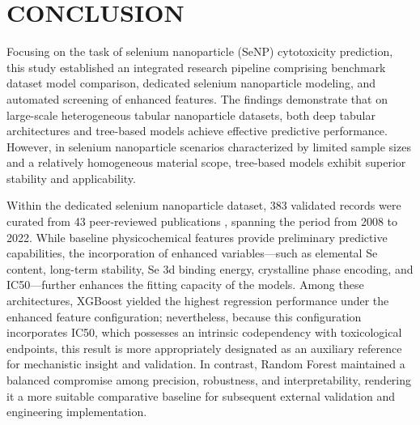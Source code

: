 \section{CONCLUSION}

Focusing on the task of selenium nanoparticle (SeNP) cytotoxicity prediction, this study established an integrated research pipeline comprising benchmark dataset model comparison, dedicated selenium nanoparticle modeling, and automated screening of enhanced features. The findings demonstrate that on large-scale heterogeneous tabular nanoparticle datasets, both deep tabular architectures and tree-based models achieve effective predictive performance. However, in selenium nanoparticle scenarios characterized by limited sample sizes and a relatively homogeneous material scope, tree-based models exhibit superior stability and applicability.

Within the dedicated selenium nanoparticle dataset, 383 validated records were curated from 43 peer-reviewed publications \cite{chen_selenium_2008, li_reversal_2011, zheng_sialic_2011, liu_selenium_2012, wu_surface_2012, chen_surface_2012,
  yu_positive_2012, chen_peg-nanolized_2012, pi_pathway_2013, wu_induction_2013, feng_differential_2014,
  huang_selective_2013, li_functionalized_2013, zhang_enhancement_2013, jiang_gracilaria_2014, yu_ph-responsive_2014,
  zeng_construction_2015, liu_sequentially_2016, liu_facile_2016, yu_x-ray-responsive_2016, fu_rgd_2016,
  fang_targeting_2017, chen_efficient_2018, fang_dualtargeted_2018, huang_autophagy_2018, liu_highly_2018,
  wang_regulating_2016, hu_selenium_2019, zeng_potentiation_2019, huang_dual-targeting_2019, huang_highly_2019,
  zhang_systematic_2019, zheng_thermosensitive_2019, huang_chiralitydriven_2020,
  yang_lentinan-functionalized_2020, liu_rapid_2021, an_functionalized_2021, song_translational_2021,
  yang_atherosclerotic_2022, yang_functionalized_2021, liang_translational_2022, liu_specific_2022, du_highly_2022}, spanning the period from 2008 to 2022. While baseline physicochemical features provide preliminary predictive capabilities, the incorporation of enhanced variables—such as elemental Se content, long-term stability, Se 3d binding energy, crystalline phase encoding, and IC50—further enhances the fitting capacity of the models. Among these architectures, XGBoost yielded the highest regression performance under the enhanced feature configuration; nevertheless, because this configuration incorporates IC50, which possesses an intrinsic codependency with toxicological endpoints, this result is more appropriately designated as an auxiliary reference for mechanistic insight and validation. In contrast, Random Forest maintained a balanced compromise among precision, robustness, and interpretability, rendering it a more suitable comparative baseline for subsequent external validation and engineering implementation.

